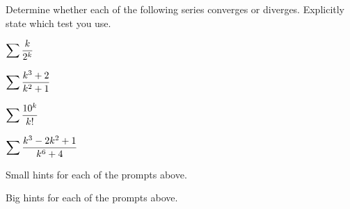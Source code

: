 \begin{activity} \label{8.3.Act9} Determine whether each of the following series  converges or diverges. Explicitly state which test you use.
\ba
\item $\displaystyle \sum \frac{k}{2^k}$

\item $\displaystyle \sum \frac{k^3+2}{k^2+1}$

\item $\displaystyle \sum \frac{10^k}{k!}$

\item $\displaystyle \sum \frac{k^3-2k^2+1}{k^6+4}$

\ea
\end{activity}

\begin{smallhint}
\ba
	\item Small hints for each of the prompts above.
\ea
\end{smallhint}
\begin{bighint}
\ba
	\item Big hints for each of the prompts above.
\ea
\end{bighint}

